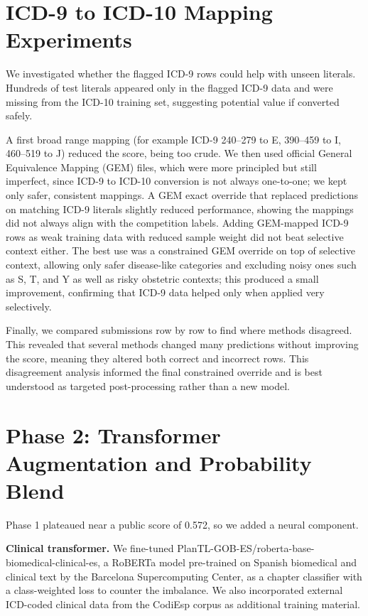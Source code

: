 \documentclass[9pt,a4paper,twoside]{utils/tau-class/tau}
\begin{document}
\section{ICD-9 to ICD-10 Mapping Experiments}

We investigated whether the flagged ICD-9 rows could help with unseen literals. Hundreds of test literals appeared only in the flagged ICD-9 data and were missing from the ICD-10 training set, suggesting potential value if converted safely.

A first broad range mapping (for example ICD-9 240--279 to E, 390--459 to I, 460--519 to J) reduced the score, being too crude. We then used official General Equivalence Mapping (GEM) files, which were more principled but still imperfect, since ICD-9 to ICD-10 conversion is not always one-to-one; we kept only safer, consistent mappings. A GEM exact override that replaced predictions on matching ICD-9 literals slightly reduced performance, showing the mappings did not always align with the competition labels. Adding GEM-mapped ICD-9 rows as weak training data with reduced sample weight did not beat selective context either. The best use was a constrained GEM override on top of selective context, allowing only safer disease-like categories and excluding noisy ones such as S, T, and Y as well as risky obstetric contexts; this produced a small improvement, confirming that ICD-9 data helped only when applied very selectively.

Finally, we compared submissions row by row to find where methods disagreed. This revealed that several methods changed many predictions without improving the score, meaning they altered both correct and incorrect rows. This disagreement analysis informed the final constrained override and is best understood as targeted post-processing rather than a new model.

\section{Phase 2: Transformer Augmentation and Probability Blend}

Phase 1 plateaued near a public score of 0.572, so we added a neural component.

\textbf{Clinical transformer.} We fine-tuned PlanTL-GOB-ES/roberta-base-biomedical-clinical-es, a RoBERTa model pre-trained on Spanish biomedical and clinical text by the Barcelona Supercomputing Center, as a chapter classifier with a class-weighted loss to counter the imbalance. We also incorporated external ICD-coded clinical data from the CodiEsp corpus as additional training material.
\end{document}
